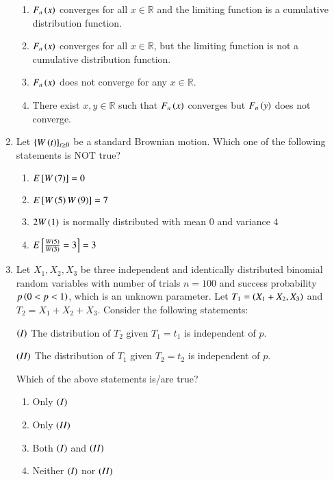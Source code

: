 \documentclass[journal]{IEEEtran}
\numberwithin{equation}{enumi}
\numberwithin{figure}{enumi}
\newcommand{\lt}{<}
\begin{document}
\begin{enumerate}
\begin{enumerate}
    \item $F_n\left(x\right)$ converges for all $x \in \mathbb{R}$ and the limiting function is a cumulative distribution function.
    \item $F_n\left(x\right)$ converges for all $x \in \mathbb{R}$, but the limiting function is not a cumulative distribution function.
    \item $F_n\left(x\right)$ does not converge for any $x \in \mathbb{R}$.
    \item There exist $x, y \in \mathbb{R}$ such that $F_n\left(x\right)$ converges but $F_n\left(y\right)$ does not converge.
\end{enumerate}

\item Let $\{W\left(t\right)\}_{t\geq 0}$ be a standard Brownian motion. Which one of the following statements is NOT true?

\begin{enumerate}
    \item $E{}\left[W\left(7\right)\right] = 0$
    \item $E{}\left[W\left(5\right)W\left(9\right)\right] = 7$
    \item $2W\left(1\right)$ is normally distributed with mean $0$ and variance $4$
    \item $E{}\left[\frac{W\left(5\right)}{W\left(3\right)} = 3\right] = 3$
\end{enumerate}

\item Let $X_1, X_2, X_3$ be three independent and identically distributed binomial random variables with number of trials $n = 100$ and success probability $p \brak{0 \lt p \lt 1}$, which is an unknown parameter. Let $T_1 = \left(X_1 + X_2, X_3\right)$ and $T_2 = X_1 + X_2 + X_3$. Consider the following statements:

$\left(I\right)$ The distribution of $T_2$ given $T_1 = t_1$ is independent of $p$.

$\left(II\right)$ The distribution of $T_1$ given $T_2 = t_2$ is independent of $p$.

Which of the above statements is/are true?

\begin{enumerate}
    \item Only $\left(I\right)$
    \item Only $\left(II\right)$
    \item Both $\left(I\right)$ and $\left(II\right)$
    \item Neither $\left(I\right)$ nor $\left(II\right)$
\end{enumerate}


\end{enumerate}
\end{document}
